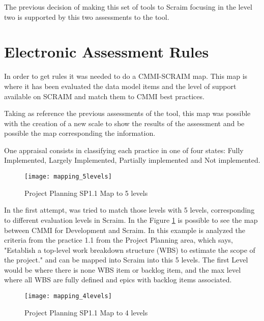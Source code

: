 The previous decision of making this set of tools to Scraim focusing in the level two is supported by this two assessments to the tool.



\section{Electronic Assessment Rules} \label{sec:mapping}
In order to get rules it was needed to do a CMMI-SCRAIM map. 
This map is where it has been evaluated the data model items and the level of support available on SCRAIM and match them to CMMI best practices.

Taking as reference the previous assessments of the tool, this map was possible with the creation of a new scale to show the results of the assessment and be possible the map corresponding the information.

One appraisal consists in classifying each practice in one of four states: Fully Implemented, Largely Implemented, Partially implemented and Not implemented.

\begin{figure}[h]
	\begin{center}
		\leavevmode
		\texttt{[image: mapping\_5levels]}
		\caption{Project Planning SP1.1 Map to 5 levels}
		\label{fig:mapping_5levels}
	\end{center}
\end{figure}

In the first attempt, was tried to match those levels with 5 levels, corresponding to different evaluation levels in Scraim. In the Figure \ref{fig:mapping_5levels} is possible to see the map between CMMI for Development and Scraim. In this example is analyzed the criteria from the practice 1.1 from the Project Planning area, which says, "Establish a top-level work breakdown structure (WBS) to estimate the scope of the project." and can be mapped into Scraim into this 5 levels. The first Level would be where there is none WBS item or backlog item, and the max level where all WBS are fully defined and epics with backlog items associated. 

\begin{figure}[h]
	\begin{center}
		\leavevmode
		\texttt{[image: mapping\_4levels]}
		\caption{Project Planning SP1.1 Map to 4 levels}
		\label{fig:mapping_4levels}
	\end{center}
\end{figure}

